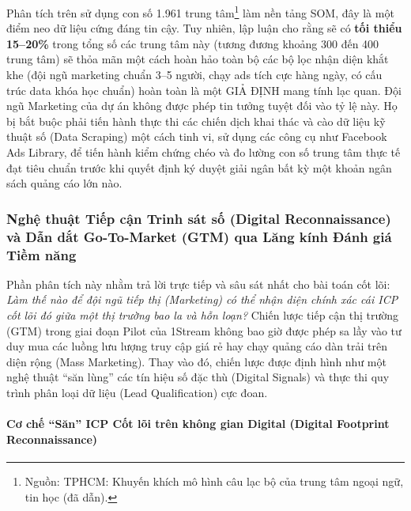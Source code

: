\begin{WarningBox}
Phân tích trên sử dụng con số 1.961 trung tâm\footnote{Nguồn: TPHCM: Khuyến khích mô hình câu lạc bộ của trung tâm ngoại ngữ, tin học (đã dẫn).} làm nền tảng SOM, đây là một điểm neo dữ liệu cứng đáng tin cậy. Tuy nhiên, lập luận cho rằng sẽ có \textbf{tối thiểu 15--20\%} trong tổng số các trung tâm này (tương đương khoảng 300 đến 400 trung tâm) sẽ thỏa mãn một cách hoàn hảo toàn bộ các bộ lọc nhận diện khắt khe (đội ngũ marketing chuẩn 3--5 người, chạy ads tích cực hàng ngày, có cấu trúc data khóa học chuẩn) hoàn toàn là một GIẢ ĐỊNH mang tính lạc quan. Đội ngũ Marketing của dự án không được phép tin tưởng tuyệt đối vào tỷ lệ này. Họ bị bắt buộc phải tiến hành thực thi các chiến dịch khai thác và cào dữ liệu kỹ thuật số (Data Scraping) một cách tinh vi, sử dụng các công cụ như Facebook Ads Library, để tiến hành kiểm chứng chéo và đo lường con số trung tâm thực tế đạt tiêu chuẩn trước khi quyết định ký duyệt giải ngân bất kỳ một khoản ngân sách quảng cáo lớn nào.
\end{WarningBox}

\subsubsection{Nghệ thuật Tiếp cận Trinh sát số (Digital Reconnaissance) và Dẫn dắt Go-To-Market (GTM) qua Lăng kính Đánh giá Tiềm năng}

Phần phân tích này nhằm trả lời trực tiếp và sâu sát nhất cho bài toán cốt lõi: \textit{Làm thế nào để đội ngũ tiếp thị (Marketing) có thể nhận diện chính xác cái ICP cốt lõi đó giữa một thị trường bao la và hỗn loạn?} Chiến lược tiếp cận thị trường (GTM) trong giai đoạn Pilot của 1Stream không bao giờ được phép sa lầy vào tư duy mua các luồng lưu lượng truy cập giá rẻ hay chạy quảng cáo dàn trải trên diện rộng (Mass Marketing). Thay vào đó, chiến lược được định hình như một nghệ thuật ``săn lùng'' các tín hiệu số đặc thù (Digital Signals) và thực thi quy trình phân loại dữ liệu (Lead Qualification) cực đoan.

\paragraph{Cơ chế ``Săn'' ICP Cốt lõi trên không gian Digital (Digital Footprint Reconnaissance)}

